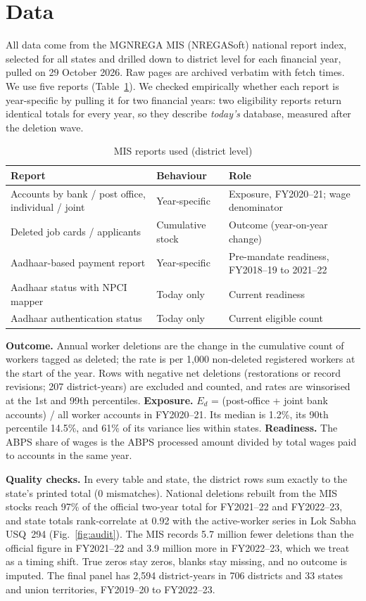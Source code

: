 \documentclass[10pt,twocolumn,letterpaper]{article}
\begin{document}
\section{Data}
All data come from the MGNREGA MIS (NREGASoft) national report index, selected for all states and drilled down to district level for each financial year, pulled on 29 October 2026. Raw pages are archived verbatim with fetch times. We use five reports (Table~\ref{tab:data}). We checked empirically whether each report is year-specific by pulling it for two financial years: two eligibility reports return identical totals for every year, so they describe \emph{today's} database, measured after the deletion wave.

\begin{table}[t]
\centering\footnotesize
\caption{MIS reports used (district level)}\label{tab:data}
\begin{tabular}{@{}p{2.9cm}p{1.9cm}p{2.9cm}@{}}
\toprule
Report & Behaviour & Role\\
\midrule
Accounts by bank / post office, individual / joint & Year-specific & Exposure, FY2020--21; wage denominator\\
Deleted job cards / applicants & Cumulative stock & Outcome (year-on-year change)\\
Aadhaar-based payment report & Year-specific & Pre-mandate readiness, FY2018--19 to 2021--22\\
Aadhaar status with NPCI mapper & Today only & Current readiness\\
Aadhaar authentication status & Today only & Current eligible count\\
\bottomrule
\end{tabular}
\end{table}

\textbf{Outcome.} Annual worker deletions are the change in the cumulative count of workers tagged as deleted; the rate is per 1,000 non-deleted registered workers at the start of the year. Rows with negative net deletions (restorations or record revisions; 207 district-years) are excluded and counted, and rates are winsorised at the 1st and 99th percentiles. \textbf{Exposure.} $E_d$ = (post-office + joint bank accounts) / all worker accounts in FY2020--21. Its median is 1.2\%, its 90th percentile 14.5\%, and 61\% of its variance lies within states. \textbf{Readiness.} The ABPS share of wages is the ABPS processed amount divided by total wages paid to accounts in the same year.

\textbf{Quality checks.} In every table and state, the district rows sum exactly to the state's printed total (0 mismatches). National deletions rebuilt from the MIS stocks reach 97\% of the official two-year total for FY2021--22 and FY2022--23, and state totals rank-correlate at 0.92 with the active-worker series in Lok Sabha USQ~294 (Fig.~\ref{fig:audit}). The MIS records 5.7 million fewer deletions than the official figure in FY2021--22 and 3.9 million more in FY2022--23, which we treat as a timing shift. True zeros stay zeros, blanks stay missing, and no outcome is imputed. The final panel has 2,594 district-years in 706 districts and 33 states and union territories, FY2019--20 to FY2022--23.
\end{document}
